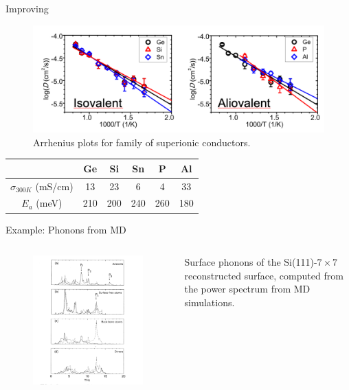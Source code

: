 \documentclass[aspectratio=169]{beamer}
\begin{document}
\begin{frame}{Improving }
\begin{figure}
    \centering    \includegraphics[width=0.65\linewidth]{lectures/figures/13-LMPS.png}
    \caption{Arrhenius plots for  family of superionic conductors.\cite{ongPhaseStabilityElectrochemical2013}}
\end{figure} 

\begin{table}[]
    \centering
    \begin{tabular}{c|c|c|c|c|c}
        & Ge & Si & Sn & P & Al\\
        \hline
        $\sigma_{300K}$ (mS/cm) & 13 & 23 & 6 & 4 & 33 \\
        $E_a$ (meV)  & 210 & 200 & 240 & 260 & 180
    \end{tabular}
\end{table}

\end{frame} 

\begin{frame}{Example: Phonons from MD}
\begin{columns}
\begin{figure}
    \centering
    \includegraphics[width=0.7\linewidth]{lectures/figures/13-Phonons_MD.png}
\end{figure} 
Surface phonons of the Si(111)-$7\times 7$ reconstructed surface, computed from the power spectrum from MD simulations.\cite{kimSurfacePhononsSi1995}
\end{columns} 
\end{frame} 
\end{document}
